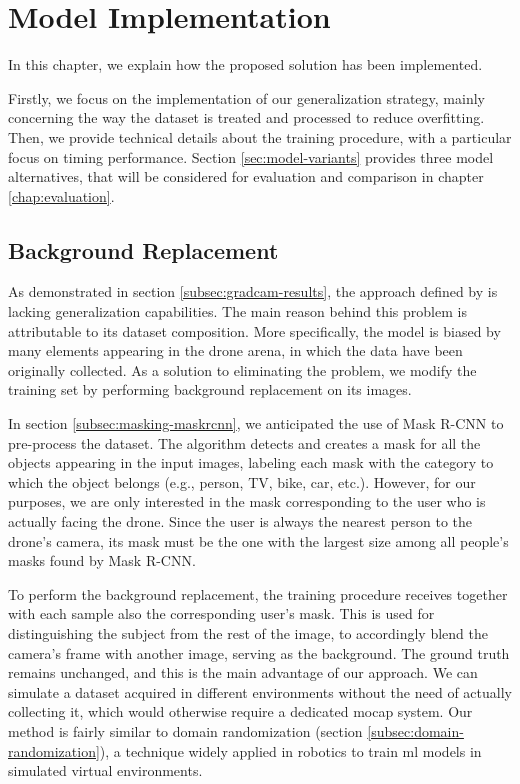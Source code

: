 \chapter{Model Implementation}
\label{chap:implementation}

In this chapter, we explain how the proposed solution has been implemented.

Firstly, we focus on the implementation of our generalization strategy, mainly concerning the way the dataset is treated and processed to reduce overfitting. Then, we provide technical details about the training procedure, with a particular focus on timing performance. Section \ref{sec:model-variants} provides three model alternatives, that will be considered for evaluation and comparison in chapter \ref{chap:evaluation}.




\section{Background Replacement}
\label{sec:implementation-bgreplace}

As demonstrated in section \ref{subsec:gradcam-results}, the approach defined by \cite{mantegazza2019visionbased} is lacking generalization capabilities. The main reason behind this problem is attributable to its dataset composition. More specifically, the model is biased by many elements appearing in the drone arena, in which the data have been originally collected. As a solution to eliminating the problem, we modify the training set by performing background replacement on its images.

In section \ref{subsec:masking-maskrcnn}, we anticipated the use of Mask R-CNN to pre-process the dataset. The algorithm detects and creates a mask for all the objects appearing in the input images, labeling each mask with the category to which the object belongs (e.g., person, TV, bike, car, etc.). However, for our purposes, we are only interested in the mask corresponding to the user who is actually facing the drone. Since the user is always the nearest person to the drone's camera, its mask must be the one with the largest size among all people's masks found by Mask R-CNN.

To perform the background replacement, the training procedure receives together with each sample also the corresponding user's mask. This is used for distinguishing the subject from the rest of the image, to accordingly blend the camera's frame with another image, serving as the background. The ground truth remains unchanged, and this is the main advantage of our approach. We can simulate a dataset acquired in different environments without the need of actually collecting it, which would otherwise require a dedicated \gls{mocap} system. Our method is fairly similar to domain randomization (section \ref{subsec:domain-randomization}), a technique widely applied in robotics to train \gls{ml} models in simulated virtual environments.


